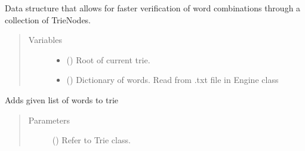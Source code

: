 \documentclass[letterpaper,10pt,english]{sphinxmanual}
\begin{document}
\begin{fulllineitems}
Data structure that allows for faster verification of word combinations through
a collection of TrieNodes.
\begin{quote}\begin{description}
\item[{Variables}] \leavevmode\begin{itemize}
\item {} 
 () \textendash{} Root of current trie.

\item {} 
 () \textendash{} Dictionary of words. Read from .txt file in Engine class

\end{itemize}

\end{description}\end{quote}


\begin{fulllineitems}
Adds given list of words to trie
\begin{quote}\begin{description}
\item[{Parameters}] \leavevmode
{} () \textendash{} Refer to Trie class.

\end{description}\end{quote}

\end{fulllineitems}


\end{fulllineitems}
\end{document}
